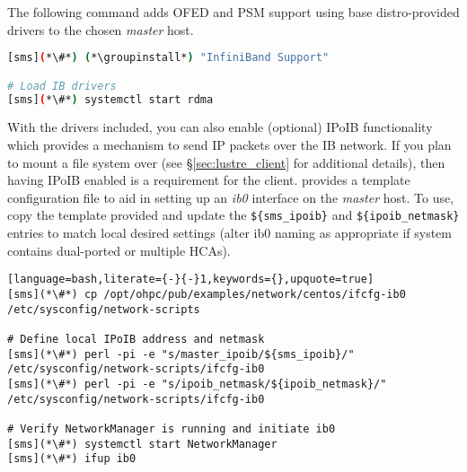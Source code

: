 The following command adds OFED and PSM support using base distro-provided drivers
to the chosen {\em master} host.

\begin{lstlisting}[language=bash,keywords={}]
[sms](*\#*) (*\groupinstall*) "InfiniBand Support"

# Load IB drivers
[sms](*\#*) systemctl start rdma
\end{lstlisting}



With the \InfiniBand{} drivers included, you can also enable (optional) IPoIB functionality
which provides a mechanism to send IP packets over the IB network. If you plan
to mount a \Lustre{} file system over \InfiniBand{} (see \S\ref{sec:lustre_client}
for additional details), then having IPoIB enabled is a requirement for the
\Lustre{} client. \OHPC{} provides a template configuration file to aid in setting up
an {\em ib0} interface on the {\em master} host. To use, copy the template
provided and update the \texttt{\$\{sms\_ipoib\}} and
\texttt{\$\{ipoib\_netmask\}} entries to match local desired settings (alter ib0
naming as appropriate if system contains dual-ported or multiple HCAs).

\begin{lstlisting}[language=bash,literate={-}{-}1,keywords={},upquote=true]
[sms](*\#*) cp /opt/ohpc/pub/examples/network/centos/ifcfg-ib0 /etc/sysconfig/network-scripts

# Define local IPoIB address and netmask
[sms](*\#*) perl -pi -e "s/master_ipoib/${sms_ipoib}/" /etc/sysconfig/network-scripts/ifcfg-ib0
[sms](*\#*) perl -pi -e "s/ipoib_netmask/${ipoib_netmask}/" /etc/sysconfig/network-scripts/ifcfg-ib0

# Verify NetworkManager is running and initiate ib0
[sms](*\#*) systemctl start NetworkManager
[sms](*\#*) ifup ib0
\end{lstlisting}

